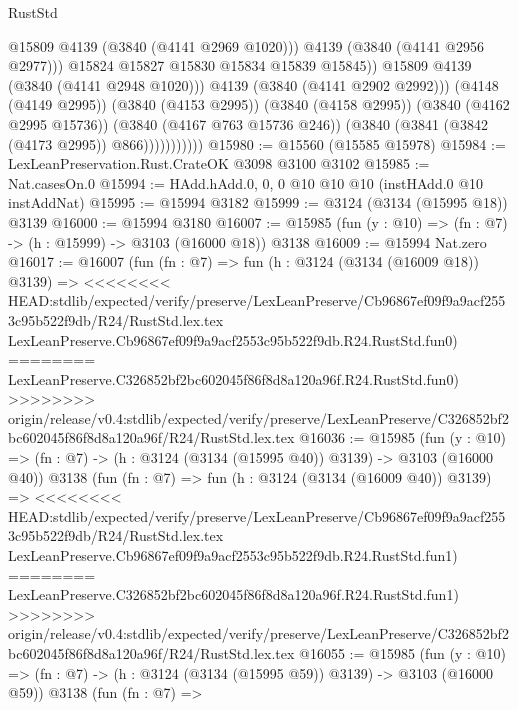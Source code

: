 \begin{lexlean}{RustStd}
\begin{coremodule}
{\begin{coremodule}
{{{{{{{{{{{{{{{{{{{{{{{{{{                                  @15809
                                  @4139
                                  (@3840 (@4141 @2969 @1020)))
                                @4139
                                (@3840 (@4141 @2956 @2977)))
                              @15824
                              @15827
                              @15830
                              @15834
                              @15839
                              @15845))
                          @15809
                          @4139
                          (@3840 (@4141 @2948 @1020)))
                        @4139
                        (@3840 (@4141 @2902 @2992)))
                      (@4148 (@4149 @2995))
                      (@3840 (@4153 @2995))
                      (@3840 (@4158 @2995))
                      (@3840 (@4162 @2995 @15736))
                      (@3840 (@4167 @763 @15736 @246))
                      (@3840 (@3841 (@3842 (@4173 @2995)) @866)))))))))))
@15980 := @15560 (@15585 @15978)
@15984 := LexLeanPreservation.Rust.CrateOK @3098 @3100 @3102
@15985 := Nat.casesOn.{0}
@15994 := HAdd.hAdd.{0, 0, 0} @10 @10 @10 (instHAdd.{0} @10 instAddNat)
@15995 := @15994 @3182
@15999 := @3124 (@3134 (@15995 @18)) @3139
@16000 := @15994 @3180
@16007 := @15985 (fun (y : @10) => (fn : @7) -> (h : @15999) -> @3103 (@16000 @18)) @3138
@16009 := @15994 Nat.zero
@16017 := @16007
    (fun (fn : @7) =>
    fun (h : @3124 (@3134 (@16009 @18)) @3139) =>
<<<<<<<< HEAD:stdlib/expected/verify/preserve/LexLeanPreserve/Cb96867ef09f9a9acf2553c95b522f9db/R24/RustStd.lex.tex
    LexLeanPreserve.Cb96867ef09f9a9acf2553c95b522f9db.R24.RustStd.fun0)
========
    LexLeanPreserve.C326852bf2bc602045f86f8d8a120a96f.R24.RustStd.fun0)
>>>>>>>> origin/release/v0.4:stdlib/expected/verify/preserve/LexLeanPreserve/C326852bf2bc602045f86f8d8a120a96f/R24/RustStd.lex.tex
@16036 := @15985
    (fun (y : @10) => (fn : @7) -> (h : @3124 (@3134 (@15995 @40)) @3139) -> @3103 (@16000 @40))
    @3138
    (fun (fn : @7) =>
    fun (h : @3124 (@3134 (@16009 @40)) @3139) =>
<<<<<<<< HEAD:stdlib/expected/verify/preserve/LexLeanPreserve/Cb96867ef09f9a9acf2553c95b522f9db/R24/RustStd.lex.tex
    LexLeanPreserve.Cb96867ef09f9a9acf2553c95b522f9db.R24.RustStd.fun1)
========
    LexLeanPreserve.C326852bf2bc602045f86f8d8a120a96f.R24.RustStd.fun1)
>>>>>>>> origin/release/v0.4:stdlib/expected/verify/preserve/LexLeanPreserve/C326852bf2bc602045f86f8d8a120a96f/R24/RustStd.lex.tex
@16055 := @15985
    (fun (y : @10) => (fn : @7) -> (h : @3124 (@3134 (@15995 @59)) @3139) -> @3103 (@16000 @59))
    @3138
    (fun (fn : @7) =>
}}}}}}}}}}}}}}}}}}}}}}}}}}
\end{coremodule}}
\end{coremodule}
\end{lexlean}
